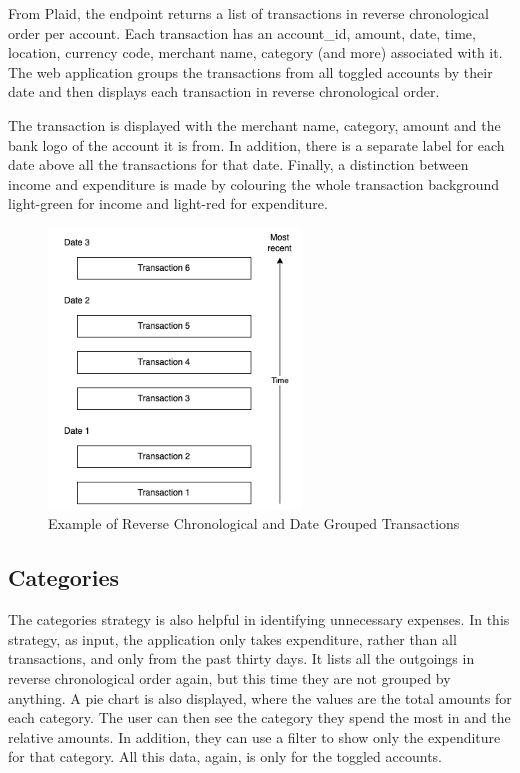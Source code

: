 From Plaid, the endpoint returns a list of transactions in reverse chronological order per account. Each transaction has an account\_id, amount, date, time, location, currency code, merchant name, category (and more) associated with it. The web application groups the transactions from all toggled accounts by their date and then displays each transaction in reverse chronological order.

The transaction is displayed with the merchant name, category, amount and the bank logo of the account it is from. In addition, there is a separate label for each date above all the transactions for that date. Finally, a distinction between income and expenditure is made by colouring the whole transaction background light-green for income and light-red for expenditure.

\vspace{\baselineskip}

\begin{figure}[H]
	\centering
	\includegraphics[width=0.6\textwidth]{images/transaction_labels.png}
	\caption{Example of Reverse Chronological and Date Grouped Transactions}
	\label{fig:TransactionLabels}
\end{figure}

\subsection{Categories}
The categories strategy is also helpful in identifying unnecessary expenses. In this strategy, as input, the application only takes expenditure, rather than all transactions, and only from the past thirty days. It lists all the outgoings in reverse chronological order again, but this time they are not grouped by anything. A pie chart is also displayed, where the values are the total amounts for each category. The user can then see the category they spend the most in and the relative amounts. In addition, they can use a filter to show only the expenditure for that category. All this data, again, is only for the toggled accounts.

